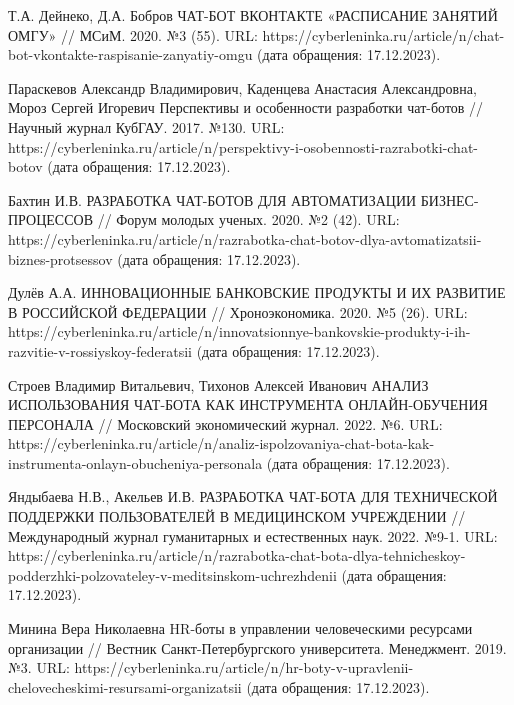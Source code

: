 \documentclass{article}
\begin{document}
Т.А. Дейнеко, Д.А. Бобров ЧАТ-БОТ ВКОНТАКТЕ «РАСПИСАНИЕ ЗАНЯТИЙ ОМГУ» // МСиМ. 2020. №3 (55). URL: https://cyberleninka.ru/article/n/chat-bot-vkontakte-raspisanie-zanyatiy-omgu (дата обращения: 17.12.2023).

Параскевов Александр Владимирович, Каденцева Анастасия Александровна, Мороз Сергей Игоревич Перспективы и особенности разработки чат-ботов // Научный журнал КубГАУ. 2017. №130. URL: https://cyberleninka.ru/article/n/perspektivy-i-osobennosti-razrabotki-chat-botov (дата обращения: 17.12.2023).

Бахтин И.В. РАЗРАБОТКА ЧАТ-БОТОВ ДЛЯ АВТОМАТИЗАЦИИ БИЗНЕС- ПРОЦЕССОВ // Форум молодых ученых. 2020. №2 (42). URL: https://cyberleninka.ru/article/n/razrabotka-chat-botov-dlya-avtomatizatsii-biznes-protsessov (дата обращения: 17.12.2023).

Дулёв А.А. ИННОВАЦИОННЫЕ БАНКОВСКИЕ ПРОДУКТЫ И ИХ РАЗВИТИЕ В РОССИЙСКОЙ ФЕДЕРАЦИИ // Хроноэкономика. 2020. №5 (26). URL: https://cyberleninka.ru/article/n/innovatsionnye-bankovskie-produkty-i-ih-razvitie-v-rossiyskoy-federatsii (дата обращения: 17.12.2023).

Строев Владимир Витальевич, Тихонов Алексей Иванович АНАЛИЗ ИСПОЛЬЗОВАНИЯ ЧАТ-БОТА КАК ИНСТРУМЕНТА ОНЛАЙН-ОБУЧЕНИЯ ПЕРСОНАЛА // Московский экономический журнал. 2022. №6. URL: https://cyberleninka.ru/article/n/analiz-ispolzovaniya-chat-bota-kak-instrumenta-onlayn-obucheniya-personala (дата обращения: 17.12.2023).

Яндыбаева Н.В., Акельев И.В. РАЗРАБОТКА ЧАТ-БОТА ДЛЯ ТЕХНИЧЕСКОЙ ПОДДЕРЖКИ ПОЛЬЗОВАТЕЛЕЙ В МЕДИЦИНСКОМ УЧРЕЖДЕНИИ // Международный журнал гуманитарных и естественных наук. 2022. №9-1. URL: https://cyberleninka.ru/article/n/razrabotka-chat-bota-dlya-tehnicheskoy-podderzhki-polzovateley-v-meditsinskom-uchrezhdenii (дата обращения: 17.12.2023).

Минина Вера Николаевна HR-боты в управлении человеческими ресурсами организации // Вестник Санкт-Петербургского университета. Менеджмент. 2019. №3. URL: https://cyberleninka.ru/article/n/hr-boty-v-upravlenii-chelovecheskimi-resursami-organizatsii (дата обращения: 17.12.2023).
\end{document}

